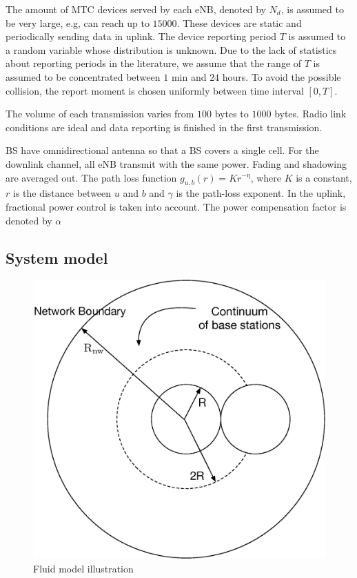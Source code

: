The amount of MTC devices served by each eNB, denoted by $N_d$, is assumed to be very large, e.g, can reach up to $15000$. These devices are static and periodically sending data in uplink. The device reporting period $T$ is assumed to a random variable whose distribution is unknown. Due to the lack of statistics about reporting periods in the literature, we assume that the range of $T$ is assumed to be concentrated between $1$ min and $24$ hours. To avoid the possible collision, the report moment is chosen uniformly between time interval $\left[ 0, T\right] $. 

The volume of each transmission varies from $100$ bytes to $1000$ bytes. Radio link conditions are ideal and data reporting is finished in the first transmission. 

BS have omnidirectional antenna so that a BS covers a single cell. For the downlink channel, all eNB transmit with the same power. Fading and shadowing are averaged out. The path loss function $g_{u,b}(r)= Kr^{-\eta}$, where $K$ is a constant, $r$ is the distance between $u$ and $b$ and $\gamma$ is the path-loss exponent. In the uplink, fractional power control is taken into account. The power compensation factor is denoted by $\alpha$
\subsection{System model}
\begin{figure}[!t]
	\centering
	\includegraphics[width=0.9\linewidth]{Chapter6/Figures/fluid_model}
	\caption{Fluid model illustration}
	\label{fig:fluid_model}
\end{figure}



